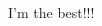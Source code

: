 \documentclass{jlreq}
\theoremstyle{definition}
\begin{document}
\title{}
\author{森}
\date{\today}
\maketitle

I'm the best!!!




\begin{thebibliography}{99}
\end{thebibliography}
\end{document}
